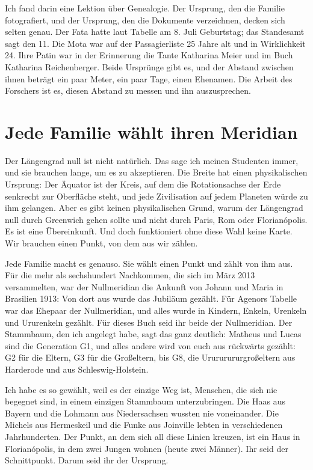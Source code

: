 \documentclass[
  ngerman,
  11pt,
  openany]{book}
\begin{document}
Ich fand darin eine Lektion über Genealogie. Der Ursprung, den die
Familie fotografiert, und der Ursprung, den die Dokumente verzeichnen,
decken sich selten genau. Der Fata hatte laut Tabelle am 8. Juli
Geburtstag; das Standesamt sagt den 11. Die Mota war auf der
Passagierliste 25 Jahre alt und in Wirklichkeit 24. Ihre Patin war in
der Erinnerung die Tante Katharina Meier und im Buch Katharina
Reichenberger. Beide Ursprünge gibt es, und der Abstand zwischen ihnen
beträgt ein paar Meter, ein paar Tage, einen Ehenamen. Die Arbeit des
Forschers ist es, diesen Abstand zu messen und ihn auszusprechen.

\section{Jede Familie wählt ihren
Meridian}\label{jede-familie-wuxe4hlt-ihren-meridian}

Der Längengrad null ist nicht natürlich. Das sage ich meinen Studenten
immer, und sie brauchen lange, um es zu akzeptieren. Die Breite hat
einen physikalischen Ursprung: Der Äquator ist der Kreis, auf dem die
Rotationsachse der Erde senkrecht zur Oberfläche steht, und jede
Zivilisation auf jedem Planeten würde zu ihm gelangen. Aber es gibt
keinen physikalischen Grund, warum der Längengrad null durch Greenwich
gehen sollte und nicht durch Paris, Rom oder Florianópolis. Es ist eine
Übereinkunft. Und doch funktioniert ohne diese Wahl keine Karte. Wir
brauchen einen Punkt, von dem aus wir zählen.

Jede Familie macht es genauso. Sie wählt einen Punkt und zählt von ihm
aus. Für die mehr als sechshundert Nachkommen, die sich im März 2013
versammelten, war der Nullmeridian die Ankunft von Johann und Maria in
Brasilien 1913: Von dort aus wurde das Jubiläum gezählt. Für Agenors
Tabelle war das Ehepaar der Nullmeridian, und alles wurde in Kindern,
Enkeln, Urenkeln und Ururenkeln gezählt. Für dieses Buch seid ihr beide
der Nullmeridian. Der Stammbaum, den ich angelegt habe, sagt das ganz
deutlich: Matheus und Lucas sind die Generation G1, und alles andere
wird von euch aus rückwärts gezählt: G2 für die Eltern, G3 für die
Großeltern, bis G8, die Urururururgroßeltern aus Harderode und aus
Schleswig-Holstein.

Ich habe es so gewählt, weil es der einzige Weg ist, Menschen, die sich
nie begegnet sind, in einem einzigen Stammbaum unterzubringen. Die Haas
aus Bayern und die Lohmann aus Niedersachsen wussten nie voneinander.
Die Michels aus Hermeskeil und die Funke aus Joinville lebten in
verschiedenen Jahrhunderten. Der Punkt, an dem sich all diese Linien
kreuzen, ist ein Haus in Florianópolis, in dem zwei Jungen wohnen (heute
zwei Männer). Ihr seid der Schnittpunkt. Darum seid ihr der Ursprung.
\end{document}
